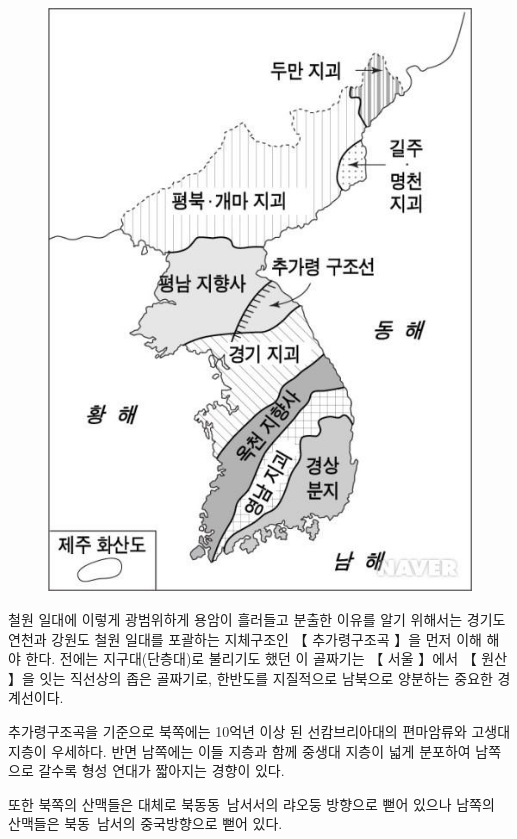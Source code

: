\documentclass[12pt,a4paper]{book}
\begin{document}
			\begin{figure}[h!]
	   		\includegraphics[width=1.0\textwidth,height=1.0\textheight]{./fig/cu-001.jpg}
			\end{figure}
			\clearpage


			철원 일대에 이렇게 광범위하게 용암이 흘러들고 분출한 이유를 알기 위해서는 
			경기도 연천과 강원도 철원 일대를 포괄하는 지체구조인 【 추가령구조곡 】을 먼저 이해 해야 한다. 
			전에는 지구대(단층대)로 불리기도 했던 이 골짜기는 【 서울 】에서 【 원산 】을 잇는 직선상의 좁은 골짜기로, 
			한반도를 지질적으로 남북으로 양분하는 중요한 경계선이다.

			추가령구조곡을 기준으로 북쪽에는 10억년 이상 된 선캄브리아대의 편마암류와 고생대 지층이 우세하다. 
			반면 남쪽에는 이들 지층과 함께 중생대 지층이 넓게 분포하여 남쪽으로 갈수록 형성 연대가 짧아지는 경향이 있다. 

			또한 북쪽의 산맥들은 대체로 북동동~남서서의 랴오둥 방향으로 뻗어 있으나 남쪽의 산맥들은 북동~남서의 중국방향으로 뻗어 있다.
\end{document}
